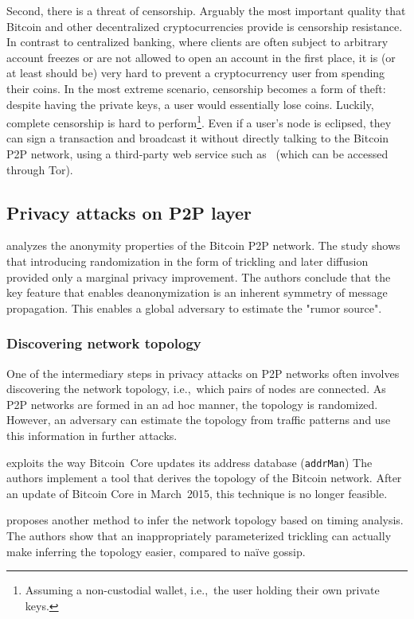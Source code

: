 Second, there is a threat of censorship.
Arguably the most important quality that Bitcoin and other decentralized cryptocurrencies provide is censorship resistance.
In contrast to centralized banking, where clients are often subject to arbitrary account freezes or are not allowed to open an account in the first place, it is (or at least should be) very hard to prevent a cryptocurrency user from spending their coins.
In the most extreme scenario, censorship becomes a form of theft: despite having the private keys, a user would essentially lose coins.
Luckily, complete censorship is hard to perform\footnote{Assuming a non-custodial wallet, i.e.,~the user holding their own private keys.}.
Even if a user's node is eclipsed, they can sign a transaction and broadcast it without directly talking to the Bitcoin P2P network, using a third-party web service such as~\cite{Blockstream} (which can be accessed through Tor).

\subsection{Privacy attacks on P2P layer}

\cite{Fanti2017} analyzes the anonymity properties of the Bitcoin P2P network.
The study shows that introducing randomization in the form of trickling and later diffusion provided only a marginal privacy improvement.
The authors conclude that the key feature that enables deanonymization is an inherent symmetry of message propagation.
This enables a global adversary to estimate the "rumor source".

\subsubsection*{Discovering network topology}

One of the intermediary steps in privacy attacks on P2P networks often involves discovering the network topology, i.e.,~which pairs of nodes are connected.
As P2P networks are formed in an ad hoc manner, the topology is randomized.
However, an adversary can estimate the topology from traffic patterns and use this information in further attacks.

\cite{Miller2015} exploits the way Bitcoin~Core updates its address database (\texttt{addrMan})
The authors implement a tool that derives the topology of the Bitcoin network.
After an update of Bitcoin Core in March~2015, this technique is no longer feasible.

\cite{Neudecker2016} proposes another method to infer the network topology based on timing analysis.
The authors show that an inappropriately parameterized trickling can actually make inferring the topology easier, compared to na{\"i}ve gossip.

